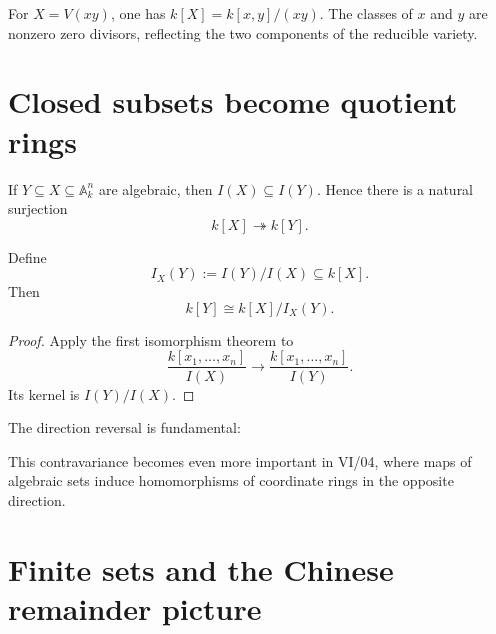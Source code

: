 \begin{example}\label{ex:vi03-expand-02}
For $X=V(xy)$, one has $k[X]=k[x,y]/(xy)$.  The classes of $x$ and $y$ are nonzero zero divisors, reflecting the two components of the reducible variety.
\end{example}
\section{Closed subsets become quotient rings}
\label{sec:vi03-closed-quotients}

If \(Y\subseteq X\subseteq\mathbb A_k^n\) are algebraic, then
\(I(X)\subseteq I(Y)\).  Hence there is a natural surjection
\[
k[X]\twoheadrightarrow k[Y].
\]

\begin{proposition}
Define
\[
I_X(Y):=I(Y)/I(X)\subseteq k[X].
\]
Then
\[
k[Y]\cong k[X]/I_X(Y).
\]
\end{proposition}

\begin{proof}
Apply the first isomorphism theorem to
\[
\frac{k[x_1,\dots,x_n]}{I(X)}\longrightarrow
\frac{k[x_1,\dots,x_n]}{I(Y)}.
\]
Its kernel is \(I(Y)/I(X)\).
\end{proof}

The direction reversal is fundamental:

\begin{center}
\end{center}

This contravariance becomes even more important in VI/04, where maps of algebraic sets
induce homomorphisms of coordinate rings in the opposite direction.

\section{Finite sets and the Chinese remainder picture}
\label{sec:vi03-finite-sets}

